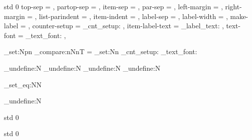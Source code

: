  {std} {0}
  {
    top-sep          = \topsep      ,
    partop-sep       = \partopsep   ,
    item-sep         = \itemsep     ,
    par-sep          = \parsep      ,
    left-margin      = \leftmargin  ,
    right-margin     = \rightmargin ,
    list-parindent   = \listparindent ,
    item-indent      = \itemindent  ,
    label-sep        =     ,
    label-width      =   ,
    make-label       = \makelabel   ,
    counter-setup    = \list_cnt_setup: ,
    item-label-text  = \list_label_text:   ,
    text-font        = \list_text_font:  ,             %
  }
  {
   
   \cs_set:Npn \MaybeExecuteEndCode {\endlist}
        {
         \AssignTemplateKeys 
         \dim_compare:nNnT  = \maxdimen
           { \dim_set:Nn  }
         \list_cnt_setup: 
         \list_text_font:
         }
  }


\cs_undefine:N \itemize
\cs_undefine:N \enumerate
\cs_undefine:N \enditemize
\cs_undefine:N \endenumerate

\cs_set_eq:NN \origitem \item
\cs_undefine:N \item


 {std} {0}
  {}

 {std} {0}
  {}
  {
   \AssignTemplateKeys
   \origitem
  }

\ExplSyntaxOff


